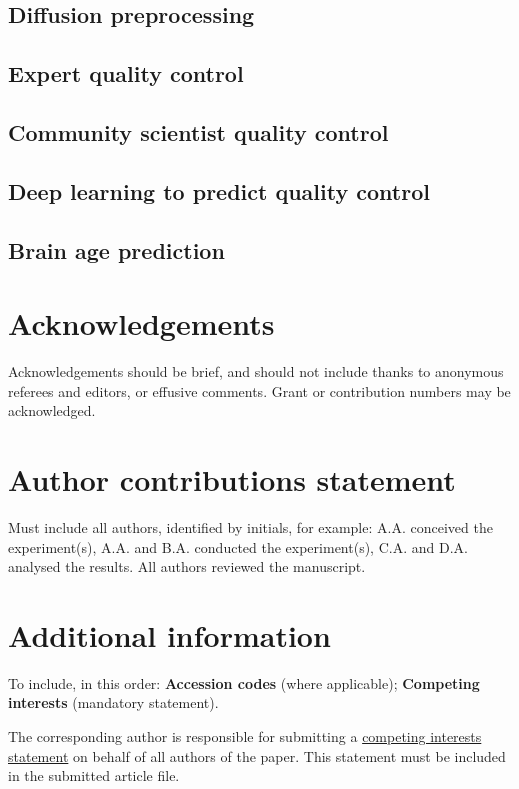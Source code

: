 \documentclass[fleqn,10pt]{wlscirep}
\begin{document}
\subsection*{Diffusion preprocessing}
\subsection*{Expert quality control}
\subsection*{Community scientist quality control}
\subsection*{Deep learning to predict quality control}
\subsection*{Brain age prediction}



\section*{Acknowledgements}

Acknowledgements should be brief, and should not include thanks to anonymous referees and editors, or effusive comments. Grant or contribution numbers may be acknowledged.

\section*{Author contributions statement}

Must include all authors, identified by initials, for example:
A.A. conceived the experiment(s),  A.A. and B.A. conducted the experiment(s), C.A. and D.A. analysed the results.  All authors reviewed the manuscript. 

\section*{Additional information}

To include, in this order: \textbf{Accession codes} (where applicable); \textbf{Competing interests} (mandatory statement). 

The corresponding author is responsible for submitting a \href{http://www.nature.com/srep/policies/index.html#competing}{competing interests statement} on behalf of all authors of the paper. This statement must be included in the submitted article file.
\end{document}
